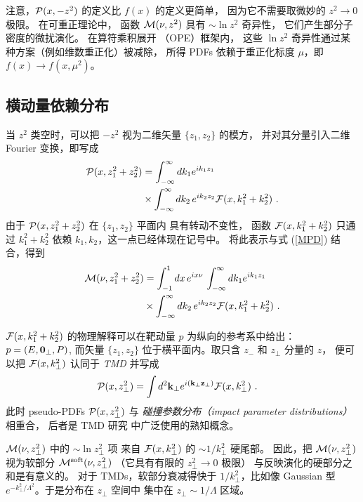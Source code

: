 注意，$ {\cal P} (x, -z^2) $ 的定义比 $f(x)$ 的定义更简单，
因为它不需要取微妙的 $z^2 \to 0$ 极限。
在可重正理论中，
函数 $ {\cal M} (\nu, z^2)  $ 具有
$\sim \ln z^2$ 奇异性，
它们产生部分子密度的微扰演化。
在算符乘积展开
（OPE）框架内，
这些 $\ln z^2$ 奇异性通过某种方案（例如维数重正化）被减除，
所得 PDFs 依赖于重正化标度 $\mu$，即
$f(x) \to   f(x, \mu^2)$。

\subsection{横动量依赖分布}

当 $z^2$ 类空时，可以把 $-z^2$
视为二维矢量 $ \{z_1,z_2\}$ 的模方，
并对其分量引入二维 Fourier 变换，即写成
\begin{align}
{\cal P} (x,  z_1^2+z_2^2)
&   =
\int_{-\infty}^\infty  {d k_1 } e^{i k_1 z_1}
\nonumber \\  & \times
\int_{-\infty}^\infty  dk_2 \,e^{ik_2z_2}
{\cal F} (x, k_1^2+k_2^2)
\   .
\label{PTMD}
\end{align}
由于 ${\cal P} (x,  z_1^2+z_2^2) $ 在 $ \{z_1,z_2\}$ 平面内
具有转动不变性，
函数 ${\cal F} (x, k_1^2+k_2^2)$ 只通过 $k_1^2+k_2^2$ 依赖
${k_1,k_2}$，这一点已经体现在记号中。
将此表示与式 (\ref{MPD}) 结合，得到
\begin{align}
{\cal M} (\nu,  z_1^2+z_2^2)
&   =  \int_{-1}^1 dx
\, e^{i x \nu  } \,
\int_{-\infty}^\infty  {d k_1 } e^{i k_1 z_1}
\nonumber \\  & \times
\int_{-\infty}^\infty  dk_2 \,e^{ik_2z_2}
{\cal F} (x, k_1^2+k_2^2)
\   .
\label{MTMD}
\end{align}

${\cal F} (x, k_1^2+k_2^2)$ 的物理解释可以在靶动量 $p$ 为纵向的参考系中给出：
\mbox{$p= (E, {\bf 0}_\perp, P)$,} 而矢量
$\{z_1,z_2\} $ 位于横平面内。取只含
$z_-$ 和 $z_\perp$ 分量的 $z$，
便可以把 ${\cal F} (x, k_\perp^2)$ 认同于
{\it TMD} 并写成
\begin{align}
{\cal P} (x,  z_\perp^2)
&   =
\int  d^2{\bf k}_\perp   e^{i ({\bf k}_\perp {\bf z}_\perp)}
{\cal F} (x, {k}_\perp^2)
\   .
\label{MTMD0}
\end{align}
此时 pseudo-PDFs $ {\cal P} (x,  z_\perp^2) $ 与
{\it 碰撞参数分布（impact parameter distributions）} 相重合，
后者是 TMD 研究
中广泛使用的熟知概念。

${\cal M} (\nu,  z_\perp^2) $ 中的
\mbox{$\sim \ln z_\perp^2$} 项
来自 ${\cal F} (x, k_\perp^2)$ 的 $\sim 1/k_\perp^2$ 硬尾部。
因此，把
${\cal M} (\nu, z_\perp^2)  $ 视为软部分 ${\cal M}^{\rm soft} (\nu, z_\perp^2)$
（它具有有限的 $z_\perp^2\to 0$ 极限）
与反映演化的硬部分之和是有意义的。
对于 TMDs，软部分衰减得快于 $1/k_\perp^2$，比如像
Gaussian 型 $e^{-k_\perp^2/\Lambda^2}$。于是分布在 $z_\perp$ 空间中
集中在 \mbox{$z_\perp \sim 1/\Lambda$} 区域。
